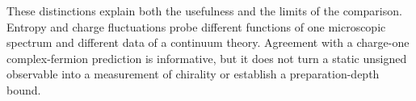 \documentclass[aps,prb,onecolumn,nofootinbib,superscriptaddress]{revtex4-2}
\begin{document}
These distinctions explain both the usefulness and the limits of the
comparison. Entropy and charge fluctuations probe different functions of
one microscopic spectrum and different data of a continuum theory.
Agreement with a charge-one complex-fermion prediction is informative,
but it does not turn a static unsigned observable into a measurement of
chirality or establish a preparation-depth bound.

\clearpage


\end{document}
